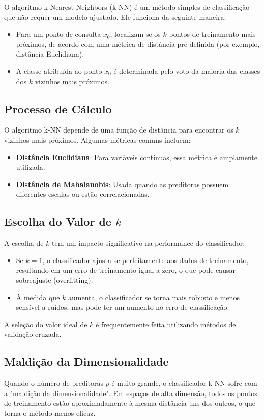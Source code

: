 \documentclass{sciposter}
\begin{document}
\begin{multicols}{3}
O algoritmo k-Nearest Neighbors (k-NN) é um método simples de classificação que não requer um modelo ajustado. Ele funciona da seguinte maneira:

\begin{itemize}
    \item Para um ponto de consulta \(x_0\), localizam-se os \(k\) pontos de treinamento mais próximos, de acordo com uma métrica de distância pré-definida (por exemplo, distância Euclidiana).
    \item A classe atribuída ao ponto \(x_0\) é determinada pelo voto da maioria das classes dos \(k\) vizinhos mais próximos.
\end{itemize}

\subsection{Processo de Cálculo}
O algoritmo k-NN depende de uma função de distância para encontrar os \(k\) vizinhos mais próximos. Algumas métricas comuns incluem:

\begin{itemize}
    \item \textbf{Distância Euclidiana}: Para variáveis contínuas, essa métrica é amplamente utilizada.
    \item \textbf{Distância de Mahalanobis}: Usada quando as preditoras possuem diferentes escalas ou estão correlacionadas.
\end{itemize}

\subsection{Escolha do Valor de \(k\)}
A escolha de \(k\) tem um impacto significativo na performance do classificador:
\begin{itemize}
    \item Se \(k = 1\), o classificador ajusta-se perfeitamente aos dados de treinamento, resultando em um erro de treinamento igual a zero, o que pode causar sobreajuste (overfitting).
    \item À medida que \(k\) aumenta, o classificador se torna mais robusto e menos sensível a ruídos, mas pode ter um aumento no erro de classificação.
\end{itemize}

A seleção do valor ideal de \(k\) é frequentemente feita utilizando métodos de validação cruzada.

\subsection{Maldição da Dimensionalidade}
Quando o número de preditoras \(p\) é muito grande, o classificador k-NN sofre com a "maldição da dimensionalidade". Em espaços de alta dimensão, todos os pontos de treinamento estão aproximadamente à mesma distância uns dos outros, o que torna o método menos eficaz.


\end{multicols}
\end{document}
